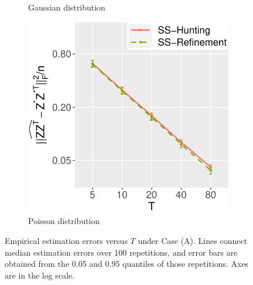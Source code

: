 \documentclass[12pt]{article}
\begin{document}
\begin{figure}
\begin{subfigure}{0.29\textwidth}
    \caption{Gaussian distribution}
\end{subfigure}
\begin{subfigure}{0.29\textwidth}
	\centering
	\includegraphics[width=1\linewidth]{Figures/Simu_PA.pdf}
    \caption{Poisson distribution}
\end{subfigure}
\caption{Empirical estimation errors versus $T$ under Case (A). Lines connect median estimation errors over 100 repetitions, and error bars are obtained from the 0.05 and 0.95 quantiles of those repetitions. Axes are in the log scale.}
\label{fig:simuA}
\end{figure}
\end{document}
